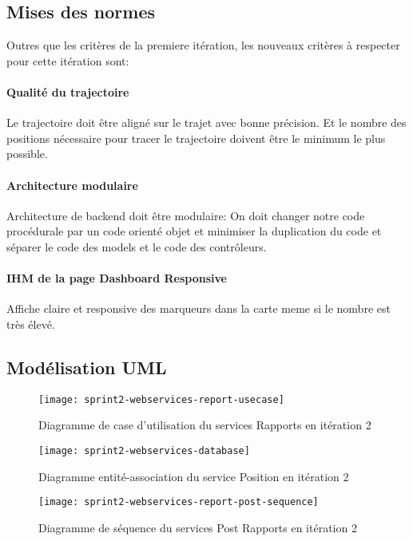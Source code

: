 \subsection{Mises des normes}

Outres que les critères de la premiere itération, les nouveaux critères à
respecter pour cette itération sont:

\paragraph{Qualité du trajectoire}
Le trajectoire doit être aligné sur le trajet avec bonne précision. Et le
nombre des positions nécessaire pour tracer le trajectoire doivent être le
minimum le plus possible.

\paragraph{Architecture modulaire}
Architecture de backend doit être modulaire: On doit changer notre code
procédurale par un code orienté objet et minimiser la duplication du code et
séparer le code des models et le code des contrôleurs.

\paragraph{IHM de la page Dashboard Responsive}
Affiche claire et responsive des marqueurs dans la carte meme si le nombre est
très élevé.

\subsection{Modélisation UML}

\begin{figure}[htbp]
    \centering
    \texttt{[image: sprint2-webservices-report-usecase]}
    \caption{Diagramme de case d'utilisation du services Rapports en itération 2}
\end{figure}

\begin{figure}[htbp]
    \centering
    \texttt{[image: sprint2-webservices-database]}
    \caption{Diagramme entité-association du service Position en itération 2}
\end{figure}

\begin{figure}[htbp]
    \centering
    \texttt{[image: sprint2-webservices-report-post-sequence]}
    \caption{Diagramme de séquence du services Post Rapports en itération 2}
\end{figure}

